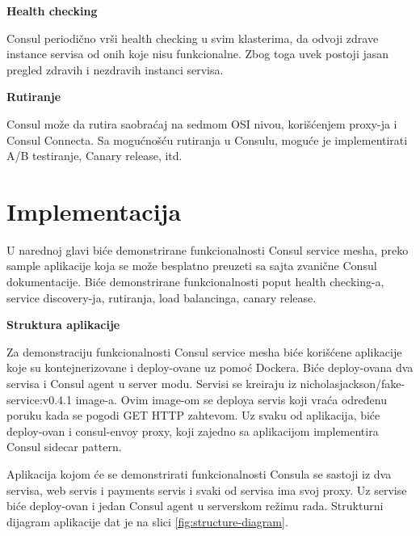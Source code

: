 \documentclass[a4paper,12pt]{report}
\begin{document}
\textbf{Health checking}\newline

Consul periodično vrši health checking u svim klasterima, da odvoji zdrave instance servisa od onih koje nisu funkcionalne. Zbog toga uvek postoji jasan pregled zdravih i nezdravih instanci servisa. \newline

\textbf{Rutiranje}\newline

Consul može da rutira saobraćaj na sedmom OSI nivou, korišćenjem proxy-ja i Consul Connecta. Sa mogućnošću rutiranja u Consulu, moguće je implementirati A/B testiranje, Canary release, itd. \newline

\section{Implementacija }

U narednoj glavi biće demonstrirane funkcionalnosti Consul service mesha, preko sample aplikacije koja se može besplatno preuzeti sa sajta zvanične Consul dokumentacije.  Biće demonstrirane funkcionalnosti poput health checking-a, service discovery-ja, rutiranja, load balancinga, canary release.  \newline

\textbf{Struktura aplikacije}\newline

Za demonstraciju funkcionalnosti Consul service mesha biće korišćene aplikacije koje su kontejnerizovane i deploy-ovane uz pomoć Dockera. Biće deploy-ovana dva servisa i Consul agent u server modu. Servisi se kreiraju iz nicholasjackson/fake-service:v0.4.1 image-a.  Ovim image-om se deploya servis koji vraća određenu poruku kada se pogodi GET HTTP zahtevom. Uz svaku od aplikacija, biće deploy-ovan i consul-envoy proxy, koji zajedno sa aplikacijom implementira Consul sidecar pattern. \newline

Aplikacija kojom će se demonstrirati funkcionalnosti Consula se sastoji iz dva servisa, web servis i payments servis i svaki od servisa ima svoj proxy. Uz servise biće deploy-ovan i jedan Consul agent u serverskom režimu rada. Strukturni dijagram aplikacije dat je na slici \ref{fig:structure-diagram}.\newline
\end{document}
